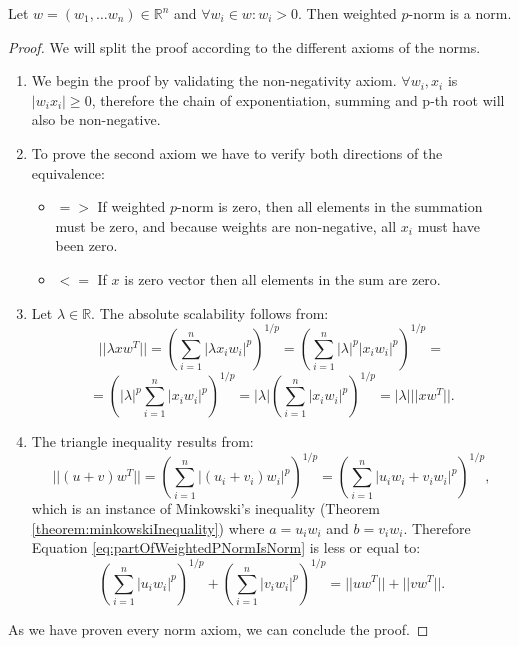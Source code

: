 	\begin{theorem}
		\label{theorem:weightedpnormisnorm}
		Let $w = (w_1, \dots w_n) \in \mathbb{R}^n$ and $\forall w_i \in w: w_i > 0$. Then weighted $p$-norm is a norm.
		\begin{proof}
			We will split the proof according to the different axioms of the norms.
			\begin{enumerate}
				\item We begin the proof by validating the non-negativity axiom. $\forall w_i,x_i$ is $|w_ix_i| \ge 0$, therefore the chain of exponentiation, summing and p-th root will also be non-negative.
				\item  To prove the second axiom we have to verify both directions of the equivalence:
				\begin{itemize}
					\item $=>$ If weighted $p$-norm is zero, then all elements in the summation must be zero, and because weights are non-negative, all $x_i$ must have been zero.
					\item $<=$ If $x$ is zero vector then all elements in the sum are zero.
				\end{itemize}
				\item Let $\lambda \in \mathbb{R}$. The absolute scalability follows from:
				\begin{equation*}
				||\lambda x w^T||={\left( \sum_{i=1}^{n}|\lambda x_i w_i|^p \right)}^{1/p} = {\left( \sum_{i=1}^{n}|\lambda|^p|x_i w_i|^p \right)}^{1/p}= 
				\end{equation*}
				\begin{equation*}
				=  {\left(|\lambda|^p \sum_{i=1}^{n}|x_i w_i|^p \right)}^{1/p} = |\lambda|{\left(\sum_{i=1}^{n}|x_i w_i|^p \right)}^{1/p}=|\lambda|||x w^T||.
				\end{equation*}
				\item The triangle inequality results from:			
				\begin{equation}			
				||(u+v)w^T|| = {\left( \sum_{i=1}^{n}|(u_i+v_i) w_i|^p \right)}^{1/p} ={\left( \sum_{i=1}^{n}|u_iw_i+v_iw_i|^p \right)}^{1/p},
				\label{eq:partOfWeightedPNormIsNorm}
				\end{equation}
				which is an instance of Minkowski's inequality (Theorem \ref{theorem:minkowskiInequality}) where $a=u_iw_i$ and $b=v_iw_i$. Therefore Equation \ref{eq:partOfWeightedPNormIsNorm} is less or equal to:
				\begin{equation*}
				{\left( \sum_{i=1}^{n}|u_iw_i|^p \right)}^{1/p} + {\left( \sum_{i=1}^{n}|v_iw_i|^p \right)}^{1/p}=	||uw^T|| + 	||vw^T||.
				\end{equation*}
			\end{enumerate}
		As we have proven every norm axiom, we can conclude the proof.
		\end{proof}	
	\end{theorem}
	

